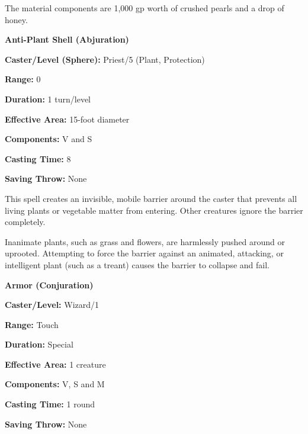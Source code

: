 \begin{multicols}{2}
The material components are 1,000 gp worth of crushed pearls and a drop of honey.

\vspace{1em}

\noindent
\begin{minipage}{\columnwidth}

\noindent \textbf{Anti-Plant Shell (Abjuration)}

\noindent \textbf{Caster/Level (Sphere):} Priest/5 (Plant, Protection)

\noindent \textbf{Range:} 0

\noindent \textbf{Duration:} 1 turn/level

\noindent \textbf{Effective Area:} 15-foot diameter

\noindent \textbf{Components:} V and S

\noindent \textbf{Casting Time:} 8

\noindent \textbf{Saving Throw:} None

\end{minipage}

This spell creates an invisible, mobile barrier around the caster that prevents all living plants or vegetable matter from entering.  Other creatures ignore the barrier completely.

Inanimate plants, such as grass and flowers, are harmlessly pushed around or uprooted.  Attempting to force the barrier against an animated, attacking, or intelligent plant (such as a treant) causes the barrier to collapse and fail.

\vspace{1em}

\noindent
\begin{minipage}{\columnwidth}

\noindent \textbf{Armor (Conjuration)}

\noindent \textbf{Caster/Level:} Wizard/1

\noindent \textbf{Range:} Touch

\noindent \textbf{Duration:}  Special

\noindent \textbf{Effective Area:} 1 creature

\noindent \textbf{Components:}  V, S and M

\noindent \textbf{Casting Time:}  1 round

\noindent \textbf{Saving Throw:}  None

\end{minipage}


\end{multicols}
